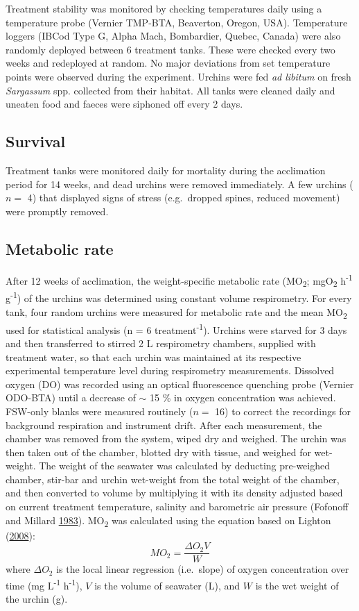 \documentclass[a4paper,10pt, oneside]{memoir}
\begin{document}
Treatment stability was monitored by checking temperatures daily using a temperature probe (Vernier TMP-BTA, Beaverton, Oregon, USA).
Temperature loggers (IBCod Type G, Alpha Mach, Bombardier, Quebec, Canada) were also randomly deployed between 6 treatment tanks.
These were checked every two weeks and redeployed at random.
No major deviations from set temperature points were observed during the experiment.
Urchins were fed \emph{ad libitum} on fresh \emph{Sargassum} spp. collected from their habitat.
All tanks were cleaned daily and uneaten food and faeces were siphoned off every 2 days.

\hypertarget{survival}{%
\subsection{Survival}\label{survival}}

Treatment tanks were monitored daily for mortality during the acclimation period for 14 weeks, and dead urchins were removed immediately.
A few urchins (\(n =\) 4) that displayed signs of stress (e.g.~dropped spines, reduced movement) were promptly removed.

\hypertarget{metabolic-rate}{%
\subsection{Metabolic rate}\label{metabolic-rate}}

After 12 weeks of acclimation, the weight-specific metabolic rate (MO\textsubscript{2}; mgO\textsubscript{2} h\textsuperscript{-1} g\textsuperscript{-1}) of the urchins was determined using constant volume respirometry.
For every tank, four random urchins were measured for metabolic rate and the mean MO\textsubscript{2} used for statistical analysis (n = 6 treatment\textsuperscript{-1}).
Urchins were starved for 3 days and then transferred to stirred 2 L respirometry chambers, supplied with treatment water, so that each urchin was maintained at its respective experimental temperature level during respirometry measurements.
Dissolved oxygen (DO) was recorded using an optical fluorescence quenching probe (Vernier ODO-BTA) until a decrease of \(\sim\) 15 \% in oxygen concentration was achieved.
FSW-only blanks were measured routinely (\(n =\) 16) to correct the recordings for background respiration and instrument drift.
After each measurement, the chamber was removed from the system, wiped dry and weighed.
The urchin was then taken out of the chamber, blotted dry with tissue, and weighed for wet-weight.
The weight of the seawater was calculated by deducting pre-weighed chamber, stir-bar and urchin wet-weight from the total weight of the chamber, and then converted to volume by multiplying it with its density adjusted based on current treatment temperature, salinity and barometric air pressure (Fofonoff and Millard \protect\hyperlink{ref-Fofonoff1983}{1983}).
MO\textsubscript{2} was calculated using the equation based on Lighton (\protect\hyperlink{ref-Lighton2008}{2008}): \[MO_2 = \frac{\Delta O_2 V}{W}\] where \(\Delta O_2\) is the local linear regression (i.e.~slope) of oxygen concentration over time (mg L\textsuperscript{-1} h\textsuperscript{-1}), \(V\) is the volume of seawater (L), and \(W\) is the wet weight of the urchin (g).
\end{document}
